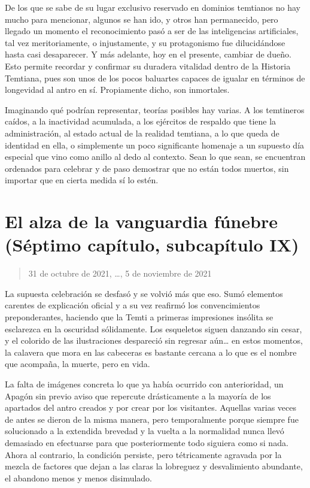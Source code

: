 \documentclass[
  spanish,
]{book}
\begin{document}
De los que se sabe de su lugar exclusivo reservado en dominios temtianos no hay mucho para mencionar, algunos se han ido, y otros han permanecido, pero llegado un momento el reconocimiento pasó a ser de las inteligencias artificiales, tal vez meritoriamente, o injustamente, y su protagonismo fue dilucidándose hasta casi desaparecer. Y más adelante, hoy en el presente, cambiar de dueño. Esto permite recordar y confirmar su duradera vitalidad dentro de la Historia Temtiana, pues son unos de los pocos baluartes capaces de igualar en términos de longevidad al antro en sí. Propiamente dicho, son inmortales.

Imaginando qué podrían representar, teorías posibles hay varias. A los temtineros caídos, a la inactividad acumulada, a los ejércitos de respaldo que tiene la administración, al estado actual de la realidad temtiana, a lo que queda de identidad en ella, o simplemente un poco significante homenaje a un supuesto día especial que vino como anillo al dedo al contexto. Sean lo que sean, se encuentran ordenados para celebrar y de paso demostrar que no están todos muertos, sin importar que en cierta medida sí lo estén.

\hypertarget{el-alza-de-la-vanguardia-fuxfanebre-suxe9ptimo-capuxedtulo-subcapuxedtulo-ix}{%
\section{El alza de la vanguardia fúnebre (Séptimo capítulo, subcapítulo IX)}\label{el-alza-de-la-vanguardia-fuxfanebre-suxe9ptimo-capuxedtulo-subcapuxedtulo-ix}}

\begin{quote}
31 de octubre de 2021, \ldots, 5 de noviembre de 2021
\end{quote}

La supuesta celebración se desfasó y se volvió más que eso. Sumó elementos carentes de explicación oficial y a su vez reafirmó los convencimientos preponderantes, haciendo que la Temti a primeras impresiones insólita se esclarezca en la oscuridad sólidamente. Los esqueletos siguen danzando sin cesar, y el colorido de las ilustraciones despareció sin regresar aún\ldots{} en estos momentos, la calavera que mora en las cabeceras es bastante cercana a lo que es el nombre que acompaña, la muerte, pero en vida.

La falta de imágenes concreta lo que ya había ocurrido con anterioridad, un Apagón sin previo aviso que repercute drásticamente a la mayoría de los apartados del antro creados y por crear por los visitantes. Aquellas varias veces de antes se dieron de la misma manera, pero temporalmente porque siempre fue solucionado a la extendida brevedad y la vuelta a la normalidad nunca llevó demasiado en efectuarse para que posteriormente todo siguiera como si nada. Ahora al contrario, la condición persiste, pero tétricamente agravada por la mezcla de factores que dejan a las claras la lobreguez y desvalimiento abundante, el abandono menos y menos disimulado.
\end{document}

